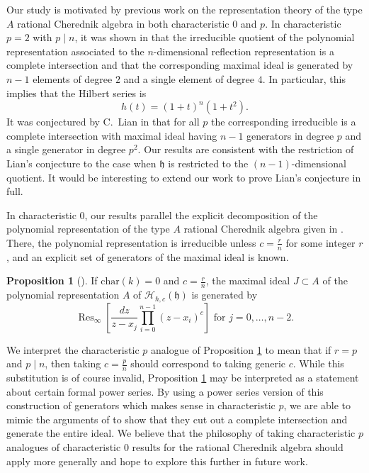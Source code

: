 \documentclass{amsart}
\numberwithin{equation}{section}
\theoremstyle{definition}
\newtheorem{proposition}[equation]{Proposition}
\newcommand{\Res}{\operatorname{Res}}
\newcommand{\h}{\mathfrak{h}}
\newcommand{\HH}{\mathcal{H}}
\renewcommand{\char}{\text{char}}
\begin{document}
Our study is motivated by previous work on the representation theory of the type $A$ rational Cherednik algebra in both characteristic $0$ and $p$.  In characteristic $p = 2$ with $p \mid n$, it was shown in \cite[Theorem 5.1]{L} that the irreducible quotient of the polynomial representation associated to the $n$-dimensional reflection representation is a complete intersection and that the corresponding maximal ideal is generated by $n - 1$ elements of degree $2$ and a single element of degree $4$.  In particular, this implies that the Hilbert series is 
\[
h(t) = (1 + t)^n (1 + t^2).
\]
It was conjectured by C.~Lian in \cite[Conjecture 5.2]{L} that for all $p$ the corresponding irreducible is a complete intersection with maximal ideal having $n - 1$ generators in degree $p$ and a single generator in degree $p^2$.  Our results are consistent with the restriction of Lian's conjecture to the case when $\h$ is restricted to the $(n - 1)$-dimensional quotient.  It would be interesting to extend our work to prove Lian's conjecture in full.

In characteristic $0$, our results parallel the explicit decomposition of the polynomial representation of the type $A$ rational Cherednik algebra given in \cite{BEG, CE}.  There, the polynomial representation is irreducible unless $c = \frac{r}{n}$ for some integer $r$, and an explicit set of generators of the maximal ideal is known.
\begin{proposition}[{\cite[Proposition 3.1]{CE}}] \label{prop:ce}
If $\char(k) = 0$ and $c = \frac{r}{n}$, the maximal ideal $J \subset A$ of the polynomial representation $A$ of $\HH_{\hbar,c}(\h)$ is generated by
\[
\Res_\infty\left[\frac{dz}{z-x_j} \prod_{i=0}^{n-1} (z-x_i)^c\right] \text{ for $j=0,\dots,n-2$}.
\]
\end{proposition}
We interpret the characteristic $p$ analogue of Proposition \ref{prop:ce} to mean that if $r = p$ and $p \mid n$, then taking $c = \frac{p}{n}$ should correspond to taking generic $c$.  While this substitution is of course invalid, Proposition \ref{prop:ce} may be interpreted as a statement about certain formal power series.  By using a power series version of this construction of generators which  makes sense in characteristic $p$, we are able to mimic the arguments of \cite{BEG, CE} to show that they cut out a complete intersection and generate the entire ideal.  We believe that the philosophy of taking characteristic $p$ analogues of characteristic $0$ results for the rational Cherednik algebra should apply more generally and hope to explore this further in future work.
\end{document}
